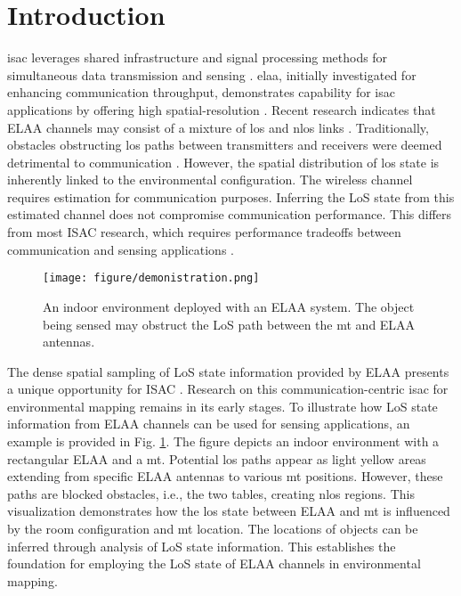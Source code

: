 \documentclass[conference, a4paper]{IEEEtran}
\newcommand{\figref}[1]{Fig. \ref{#1}}
\begin{document}
\section{Introduction}\label{sec1}
\Gls{isac} leverages shared infrastructure and signal processing methods for simultaneous data transmission and sensing \cite{Liu2022b}.
\Gls{elaa}, initially investigated for enhancing communication throughput, demonstrates capability for \gls{isac} applications by offering high spatial-resolution \cite{Cui2023}.
Recent research indicates that ELAA channels may consist of a mixture of \gls{los} and \gls{nlos} links \cite{Liu2021, Lu2023, Liu2024}.
Traditionally, obstacles obstructing \gls{los} paths between transmitters and receivers were deemed detrimental to communication \cite{Qing2024}.
However, the spatial distribution of \gls{los} state is inherently linked to the environmental configuration.
The wireless channel requires estimation for communication purposes.
Inferring the LoS state from this estimated channel does not compromise communication performance.
This differs from most ISAC research, which requires performance tradeoffs between communication and sensing applications \cite{GonzalezPrelcic2024, An2023}.

\begin{figure}[t]
	\centering
	\texttt{[image: figure/demonistration.png]}
	\caption{\label{fig01} An indoor environment deployed with an ELAA system. The object being sensed may obstruct the LoS path between the \gls{mt} and ELAA antennas.}
	\vspace{-1em}
\end{figure}

The dense spatial sampling of LoS state information provided by ELAA presents a unique opportunity for ISAC \cite{Zhi2024,Elzanaty2024}.
Research on this communication-centric \gls{isac} for environmental mapping remains in its early stages.
To illustrate how LoS state information from ELAA channels can be used for sensing applications, an example is provided in \figref{fig01}.
The figure depicts an indoor environment with a rectangular ELAA and a \gls{mt}.
Potential \gls{los} paths appear as light yellow areas extending from specific ELAA antennas to various \gls{mt} positions.
However, these paths are blocked obstacles, i.e., the two tables, creating \gls{nlos} regions.
This visualization demonstrates how the \gls{los} state between ELAA and \gls{mt} is influenced by the room configuration and \gls{mt} location.
The locations of objects can be inferred through analysis of LoS state information.
This establishes the foundation for employing the LoS state of ELAA channels in environmental mapping.
\end{document}
